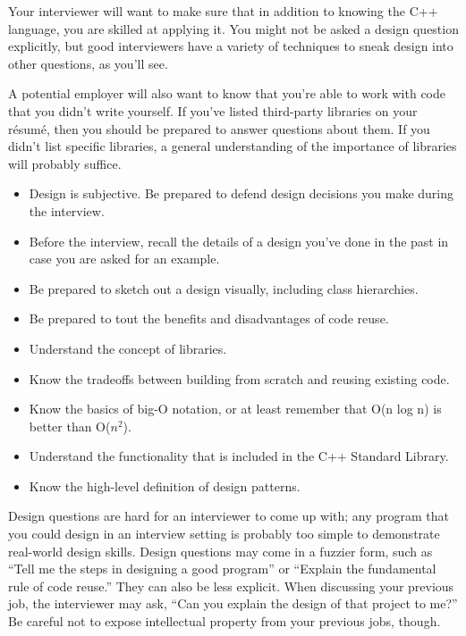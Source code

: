 
Your interviewer will want to make sure that in addition to knowing the C++ language, you are skilled at applying it. You might not be asked a design question explicitly, but good interviewers have a variety of techniques to sneak design into other questions, as you’ll see.

A potential employer will also want to know that you’re able to work with code that you didn’t write yourself. If you’ve listed third-party libraries on your résumé, then you should be prepared to answer questions about them. If you didn’t list specific libraries, a general understanding of the importance of libraries will probably suffice.


\begin{itemize}
\item
Design is subjective. Be prepared to defend design decisions you make during the interview.

\item
Before the interview, recall the details of a design you’ve done in the past in case you are asked for an example.

\item
Be prepared to sketch out a design visually, including class hierarchies.

\item
Be prepared to tout the benefits and disadvantages of code reuse.

\item
Understand the concept of libraries.

\item
Know the tradeoffs between building from scratch and reusing existing code.

\item
Know the basics of big-O notation, or at least remember that O(n log n) is better than O($n^2$).

\item
Understand the functionality that is included in the C++ Standard Library.

\item
Know the high-level definition of design patterns.
\end{itemize}


Design questions are hard for an interviewer to come up with; any program that you could design in an interview setting is probably too simple to demonstrate real-world design skills. Design questions may come in a fuzzier form, such as “Tell me the steps in designing a good program” or “Explain the fundamental rule of code reuse.” They can also be less explicit. When discussing your previous job, the interviewer may ask, “Can you explain the design of that project to me?” Be careful not to expose intellectual property from your previous jobs, though.

